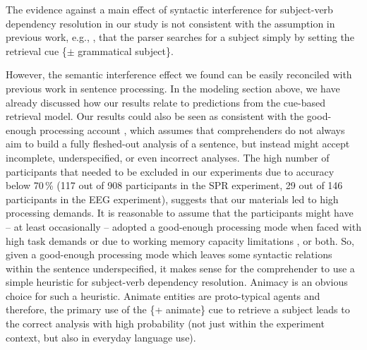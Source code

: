 \documentclass[a4paper, man, floatsintext]{apa7}
\begin{document}
The evidence against a main effect of syntactic interference for subject-verb dependency resolution in our study is not consistent with the assumption in previous work, e.g., \textcite{vandyke07,mertzen}, that the parser searches for a subject simply by setting the retrieval cue \{$\pm$ grammatical subject\}. \label{future_work} 

However, the semantic interference effect we found can be easily reconciled with previous work in  sentence processing. In the modeling section above, we have already discussed how our results relate to predictions from the \citet{Lewis2005} cue-based retrieval model.  
 Our results could also be seen as consistent with the good-enough processing account \citep{ferreira2007goodenough}, which assumes that comprehenders do not always aim to build a fully fleshed-out analysis of a sentence, but instead might accept incomplete, underspecified, or even incorrect analyses. The high number of participants that needed to be excluded in our experiments due to accuracy below 70\,\% (117 out of 908 participants in the SPR experiment, 29 out of 146 participants in the EEG experiment), suggests that our materials led to high processing demands. It is reasonable to assume that the participants might have -- at least occasionally -- adopted a good-enough processing mode when faced with high task demands \parencite{swets2008underspecification,LogacevMultiple,LogacevVasishthQJEP2016} or due to working memory capacity limitations \parencite{MalsburgVasishth2013}, or both. So, given a good-enough processing mode which leaves some syntactic relations within the sentence underspecified, it makes sense for the comprehender to use a simple heuristic for subject-verb dependency resolution. Animacy is an obvious choice for such a heuristic. Animate entities are proto-typical agents \citep{dowty1991thematic} and therefore, the primary use of the \{+ animate\} cue to retrieve a subject leads to the correct analysis with high probability (not just within the experiment context, but also in everyday language use). 
 
\end{document}
